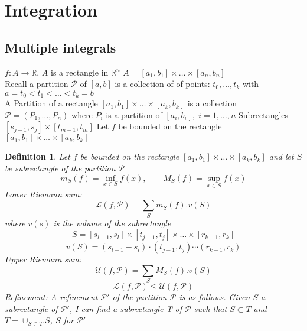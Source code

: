 \documentclass[11pt]{article}
\def\RR{\mathbb{R}}
\newtheorem{definition}{Definition}[section]
\begin{document}
\section{Integration}
\subsection{Multiple integrals}

$f:A \rightarrow \RR$, $A$ is a rectangle in $\RR^n$ $A= [a_1,b_1]\times \dots \times[a_n , b_n]$\\
Recall a partition $\mathcal{P}$ of $[a,b]$ is a collection of of points: $t_{0}, \dots , t_k$ with $a=t_0 < t_1 < \dots <t_k = b$\\
A Partition of a rectangle $ [a_1 , b_1]\times\dots \times [a_k , b_k]$ is a collection $\mathcal{P} = (P_1 , \dots , P_n)$ where $P_i$ is a partition of $[a_i, b_i], \; i=1,\dots ,n$ Subrectangles $[s_{j-1},s_j]\times[t_{m-1},t_m]$ Let $f$ be bounded on the rectangle  $ [a_1 , b_1]\times\dots \times [a_k , b_k]$

\begin{definition}
 Let $f$ be bounded on the rectangle  $ [a_1 , b_1]\times\dots \times [a_k , b_k]$ and let $S$ be subrectangle of the partition $\mathcal{P}$  
\[m_S(f) = \inf_{x \in S}f(x), \qquad M_S (f) = \sup_{x \in S}f(x) \]
Lower Riemann sum:
\[\mathcal{L}(f,\mathcal{P}) = \sum_{S}m_S(f).v(S)\]
where $v(s)$ is the volume of the subrectangle
\[S=[s_{l-1}, s_l] \times [t_{j-1},t_j] \times \dots \times[r_{k-1},r_k]\]
\[v(S)= (s_{l-1}- s_l)\cdot(t_{j-1},t_j)\cdots (r_{k-1},r_k)\]
Upper Riemann sum:
\[\mathcal{U}(f,\mathcal{P})= \sum_{S}M_S(f).v(S)\]
\[ \mathcal{L}(f,\mathcal{P}) \leq \mathcal{U}(f,\mathcal{P})\]
Refinement: A refinement $\mathcal{P}'$ of the partition $\mathcal{P}$ is as follows. Given $S$ a subrectangle of $\mathcal{P}'$, I can find a subrectangle T of $\mathcal{P}$ such that $S \subset T$ and $T= \cup_{S \subset T} S$, $S$ for $\mathcal{P}'$
\end{definition}

\setcounter{equation}{0}
\end{document}
